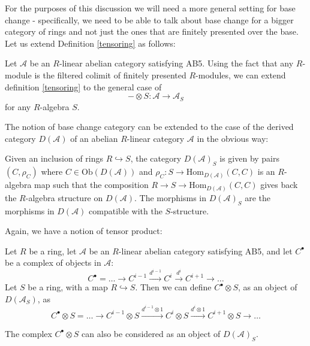 \documentclass{amsart}
\begin{document}
For the purposes of this discussion we will need a more general setting for base change - specifically, we need to be able to talk about base change for a bigger category of rings and not just the ones that are finitely presented over the base. Let us extend Definition \ref{tensoring} as follows:

\begin{definition}\label{abelian tensoring}
Let $\mathcal{A}$ be an $R$-linear abelian category satisfying AB5. Using the fact that any $R$-module is the filtered colimit of finitely presented $R$-modules, we can extend definition \ref{tensoring} to the general case of 
$$-\otimes S:\mathcal{A} {\rightarrow} \mathcal{A}_{S}$$
for any $R$-algebra $S$.
\end{definition}

The notion of base change category can be extended to the case of the derived category $D(\mathcal{A})$ of an abelian $R$-linear category $\mathcal{A}$ in the obvious way:
\begin{definition}
Given an inclusion of rings  $R\hookrightarrow S$, the category $D(\mathcal{A})_{S}$ is given by pairs $(C,\rho_{C})$ where $C\in \mathrm{Ob}(D(\mathcal{A}))$ and $\rho_{C}:S\to \mathrm{Hom}_{D(\mathcal{A})}(C,C)$ is an $R$-algebra map such that the composition $R\to S \to \mathrm{Hom}_{D(\mathcal{A})}(C,C)$ gives back the $R$-algebra structure on $D(\mathcal{A})$. The morphisms in $D(\mathcal{A})_{S}$ are the morphisms in $D(\mathcal{A})$ compatible with the $S$-structure.
\end{definition}

Again, we have a notion of tensor product:
\begin{definition}\label{more tensoring}
Let $R$ be a ring, let $\mathcal{A}$ be an $R$-linear abelian category satisfying AB5, and let $C^{\bullet}$ be a complex of objects in $\mathcal{A}$:
$$C^{\bullet}=\ldots{\rightarrow} C^{i-1}\xrightarrow{d^{i-1}} C^{i} \xrightarrow{d^{i}} C^{i+1}{\rightarrow}\ldots$$
Let $S$ be a ring, with a map $R\hookrightarrow S$. Then we can define $C^{\bullet}\otimes S$, as an object of $D(\mathscr{A}_{S})$, as
$$C^{\bullet}\otimes S=\ldots{\rightarrow} C^{i-1}\otimes S\xrightarrow{d^{i-1}\otimes 1} C^{i}\otimes S \xrightarrow{d^{i}\otimes 1} C^{i+1}\otimes S{\rightarrow}\ldots$$
\end{definition}
The complex $C^{\bullet}\otimes S$ can also be considered as an object of $D(\mathscr{A})_{S}$. 
\end{document}
